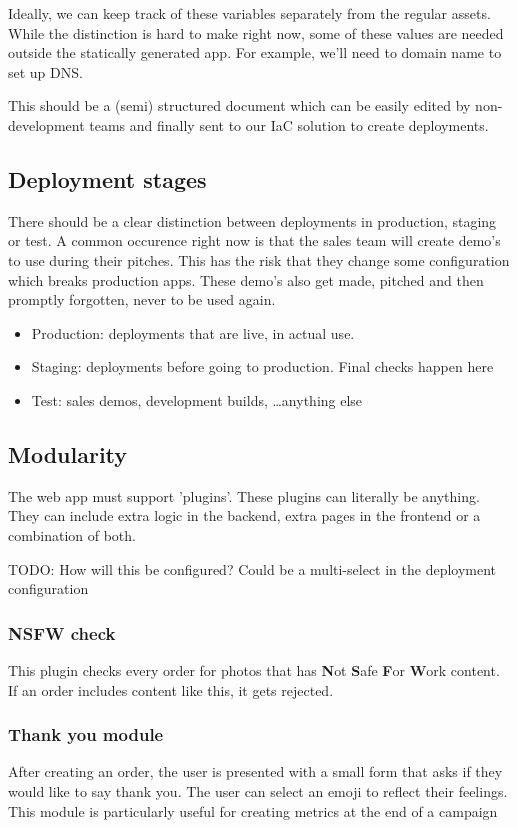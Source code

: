 Ideally, we can keep track of these variables separately from the regular assets. While the distinction is hard to make right now, some of these values are needed outside the statically generated app. For example, we'll need to domain name to set up DNS.

This should be a (semi) structured document which can be easily edited by non-development teams and finally sent to our IaC solution to create deployments.

\subsection{Deployment stages}

There should be a clear distinction between deployments in production, staging or test. 
A common occurence right now is that the sales team will create demo's to use during their pitches. This has the risk that they change some configuration which breaks production apps. These demo's also get made, pitched and then promptly forgotten, never to be used again.

\begin{itemize}
	\item Production: deployments that are live, in actual use.
	\item Staging: deployments before going to production. Final checks happen here
	\item Test: sales demos, development builds, \dots anything else
\end{itemize}

\subsection{Modularity}

The web app must support 'plugins'. These plugins can literally be anything. They can include extra logic in the backend, extra pages in the frontend or a combination of both.

TODO: How will this be configured? Could be a multi-select in the deployment configuration

\subsubsection{NSFW check}

This plugin checks every order for photos that has \textbf{N}ot \textbf{S}afe \textbf{F}or \textbf{W}ork content. If an order includes content like this, it gets rejected.

\subsubsection{Thank you module}

After creating an order, the user is presented with a small form that asks if they would like to say thank you. The user can select an emoji to reflect their feelings. 
This module is particularly useful for creating metrics at the end of a campaign

